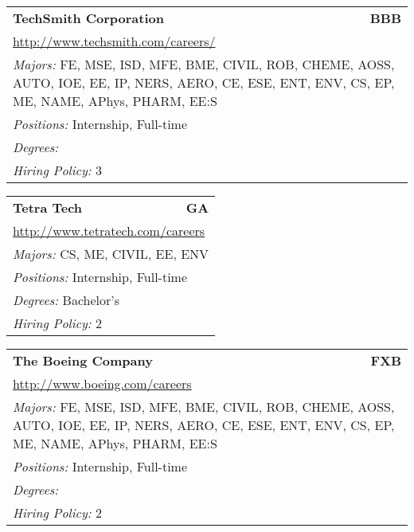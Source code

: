 \documentclass[twoside]{article}
\begin{document}
\begin{center}
\begin{multicols}{3}
\begin{FlushLeft}
\begin{minipage}{.9\columnwidth}\begin{tabularx}{.95\columnwidth}{Xr}
                 {\Large\bf TechSmith Corporation} & {\Large\bf BBB}\\
    \multicolumn{2}{p{.95\columnwidth}}{\url{http://www.techsmith.com/careers/}}\\
    \multicolumn{2}{p{.95\columnwidth}}{\emph{Majors:} FE, MSE, ISD, MFE, BME, CIVIL, ROB, CHEME, AOSS, AUTO, IOE, EE, IP, NERS, AERO, CE, ESE, ENT, ENV, CS, EP, ME, NAME, APhys, PHARM, EE:S}\\
    \multicolumn{2}{p{.95\columnwidth}}{\emph{Positions:} Internship, Full-time}\\
    \multicolumn{2}{p{.95\columnwidth}}{\emph{Degrees:} }\\
    \multicolumn{2}{p{.95\columnwidth}}{\emph{Hiring Policy:} 3}\\
    \end{tabularx}
    
\end{minipage}
 
\begin{minipage}{.9\columnwidth}\begin{tabularx}{.95\columnwidth}{Xr}
                 {\Large\bf Tetra Tech} & {\Large\bf GA}\\
    \multicolumn{2}{p{.95\columnwidth}}{\url{http://www.tetratech.com/careers}}\\
    \multicolumn{2}{p{.95\columnwidth}}{\emph{Majors:} CS, ME, CIVIL, EE, ENV}\\
    \multicolumn{2}{p{.95\columnwidth}}{\emph{Positions:} Internship, Full-time}\\
    \multicolumn{2}{p{.95\columnwidth}}{\emph{Degrees:} Bachelor's}\\
    \multicolumn{2}{p{.95\columnwidth}}{\emph{Hiring Policy:} 2}\\
    \end{tabularx}
    
\end{minipage}
 
\begin{minipage}{.9\columnwidth}\begin{tabularx}{.95\columnwidth}{Xr}
                 {\Large\bf The Boeing Company} & {\Large\bf FXB}\\
    \multicolumn{2}{p{.95\columnwidth}}{\url{http://www.boeing.com/careers}}\\
    \multicolumn{2}{p{.95\columnwidth}}{\emph{Majors:} FE, MSE, ISD, MFE, BME, CIVIL, ROB, CHEME, AOSS, AUTO, IOE, EE, IP, NERS, AERO, CE, ESE, ENT, ENV, CS, EP, ME, NAME, APhys, PHARM, EE:S}\\
    \multicolumn{2}{p{.95\columnwidth}}{\emph{Positions:} Internship, Full-time}\\
    \multicolumn{2}{p{.95\columnwidth}}{\emph{Degrees:} }\\
    \multicolumn{2}{p{.95\columnwidth}}{\emph{Hiring Policy:} 2}\\
    \end{tabularx}
    

\end{minipage}
\end{FlushLeft}
\end{multicols}
\end{center}
\end{document}
